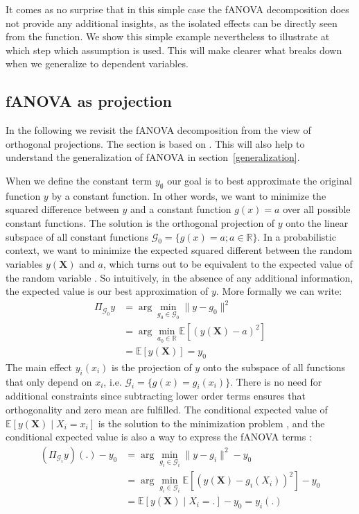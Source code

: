 It comes as no surprise that in this simple case the fANOVA decomposition does not provide any additional insights, as the isolated effects can be directly seen from the function.
We show this simple example nevertheless to illustrate at which step which assumption is used.
This will make clearer what breaks down when we generalize to dependent variables.

\subsection{fANOVA as projection}
In the following we revisit the fANOVA decomposition from the view of orthogonal projections. The section is based on \cite{Vaart_1998}.
This will also help to understand the generalization of fANOVA in section~\ref{generalization}.\par

When we define the constant term $y_\emptyset$ our goal is to best approximate the original function $y$ by a constant function. In other words, we want to minimize the squared difference between $y$ and a constant function $g(x) = a$ over all possible constant functions. The solution is the orthogonal projection of $y$ onto the linear subspace of all constant functions $\mathcal{G}_0 = \{g(x) = a; a \in \mathbb{R}\}$. In a probabilistic context, we want to minimize the expected squared different between the random variables $y(\boldsymbol{X})$ and $a$, which turns out to be equivalent to the expected value of the random variable \citep{Vaart_1998}. So intuitively, in the absence of any additional information, the expected value is our best approximation of $y$. More formally we can write:
\begin{align*}
    \Pi_{\mathcal{G}_0}y
    &= \arg \min_{g_0 \in \mathcal{G}_0} \|y - g_0\|^2 \\ %
    &= \arg \min_{a_0 \in \mathbb{R}} \mathbb{E}[(y(\boldsymbol{X}) - a)^2] \\ %
    &= \mathbb{E}[y(\boldsymbol{X})] = y_0
\end{align*}
The main effect $y_i(x_i)$ is the projection of $y$ onto the subspace of all functions that only depend on $x_i$, i.e. $\mathcal{G}_i = \{g(x) = g_i(x_i)\}$. There is no need for additional constraints since subtracting lower order terms ensures that orthogonality and zero mean are fulfilled.
The conditional expected value of $\mathbb{E}[y(\boldsymbol{X}) \mid X_i = x_i]$ is the solution to the minimization problem \citep{Vaart_1998}, and the conditional expected value is also a way to express the fANOVA terms \citep{muehlenstaedt2012}:
\begin{align*}
    (\Pi_{\mathcal{G}_i}y)(.) - y_0
    &= \arg \min_{g_i \in \mathcal{G}_i} \|y - g_i\|^2 - y_0\\
    &= \arg \min_{g_i \in \mathcal{G}_i} \mathbb{E}[(y(\boldsymbol{X}) - g_i(X_i))^2] - y_0 \\
    &= \mathbb{E}[y(\boldsymbol{X}) \mid X_i = .] - y_0 = y_i(.)
\end{align*}

